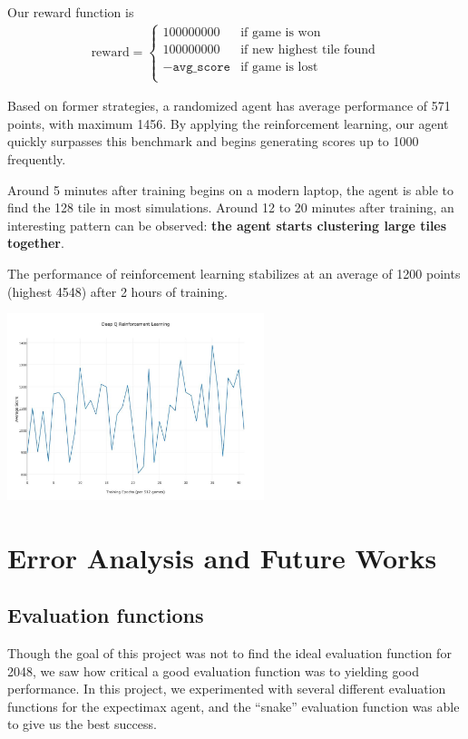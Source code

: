 \documentclass[9pt,twocolumn]{article}
\begin{document}
Our reward function is \begin{align*}
\text{reward} =
\begin{cases}
100000000 & \text{if game is won} \\
100000000 & \text{if new highest tile found} \\
-\texttt{avg\_score} & \text{if game is lost} \\
\end{cases}
\end{align*}

Based on former strategies, a randomized agent has average performance of 571 points, with maximum 1456. By applying the reinforcement learning, our agent quickly surpasses this benchmark and begins generating scores up to 1000 frequently.

Around 5 minutes after training begins on a modern laptop, the agent is able to find the 128 tile in most simulations. Around 12 to 20 minutes after training, an interesting pattern can be observed: \textbf{the agent starts clustering large tiles together}.

The performance of reinforcement learning stabilizes at an average of 1200 points (highest 4548) after 2 hours of training.

\begin{centering}

\includegraphics[width=75mm]{rl_graph.jpg}

\end{centering}

\section{Error Analysis and Future Works}

\subsection{Evaluation functions}

Though the goal of this project was not to find the ideal evaluation function for 2048, we saw how critical a good evaluation function was to yielding good performance. In this project, we experimented with several different evaluation functions for the expectimax agent, and the “snake” evaluation function was able to give us the best success.
\end{document}
